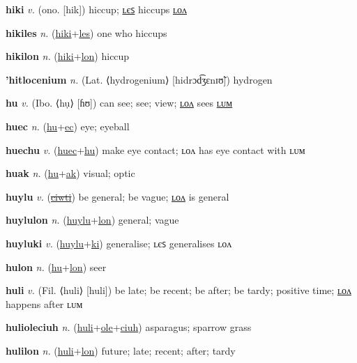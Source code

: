 \textbf{\hypertarget{hiki}{hiki}} \textit{v.} (ono. [hik])
hiccup; \hyperlink{hikiles}{ʟєꜱ} hiccups \hyperlink{hikilon}{ʟᴏᴧ}

\textbf{\hypertarget{hikiles}{hikiles}} \textit{n.} (\hyperlink{hiki}{hiki}+\allowbreak \hyperlink{les}{les})
one who hiccups

\textbf{\hypertarget{hikilon}{hikilon}} \textit{n.} (\hyperlink{hiki}{hiki}+\allowbreak \hyperlink{lon}{lon})
hiccup

\textbf{\hypertarget{'hitlocenium}{'hitlocenium}} \textit{n.} (Lat. ⟨hydrogenium⟩ [hidrɔd͡ʒɛnɪʊ̃])
hydrogen

\textbf{\hypertarget{hu}{hu}} \textit{v.} (Ibo. ⟨hụ⟩ [ɦʊ])
can see; see; view; \hyperlink{hulon}{ʟᴏᴧ} sees \hyperlink{hulum}{ʟᴜᴍ}

\textbf{\hypertarget{huec}{huec}} \textit{n.} (\hyperlink{hu}{hu}+\allowbreak \hyperlink{ec}{ec})
eye; eyeball

\textbf{\hypertarget{huechu}{huechu}} \textit{v.} (\hyperlink{huec}{huec}+\allowbreak \hyperlink{hu}{hu})
make eye contact; ʟᴏᴧ has eye contact with ʟᴜᴍ

\textbf{\hypertarget{huak}{huak}} \textit{n.} (\hyperlink{hu}{hu}+\allowbreak \hyperlink{ak}{ak})
visual; optic

\textbf{\hypertarget{huylu}{huylu}} \textit{v.} (\hyperlink{ciwti}{\sout{ciwti}})
be general; be vague; \hyperlink{huylulon}{ʟᴏᴧ} is general

\textbf{\hypertarget{huylulon}{huylulon}} \textit{n.} (\hyperlink{huylu}{huylu}+\allowbreak \hyperlink{lon}{lon})
general; vague

\textbf{\hypertarget{huyluki}{huyluki}} \textit{v.} (\hyperlink{huylu}{huylu}+\allowbreak \hyperlink{ki}{ki})
generalise; ʟєꜱ generalises ʟᴏᴧ

\textbf{\hypertarget{hulon}{hulon}} \textit{n.} (\hyperlink{hu}{hu}+\allowbreak \hyperlink{lon}{lon})
seer

\textbf{\hypertarget{huli}{huli}} \textit{v.} (Fil. ⟨huli⟩ [huli])
be late; be recent; be after; be tardy; positive time; \hyperlink{hulilon}{ʟᴏᴧ} happens after ʟᴜᴍ

\textbf{\hypertarget{hulioleciuh}{hulioleciuh}} \textit{n.} (\hyperlink{huli}{huli}+\allowbreak \hyperlink{ole}{ole}+\allowbreak \hyperlink{ciuh}{ciuh})
asparagus; sparrow grass

\textbf{\hypertarget{hulilon}{hulilon}} \textit{n.} (\hyperlink{huli}{huli}+\allowbreak \hyperlink{lon}{lon})
future; late; recent; after; tardy

